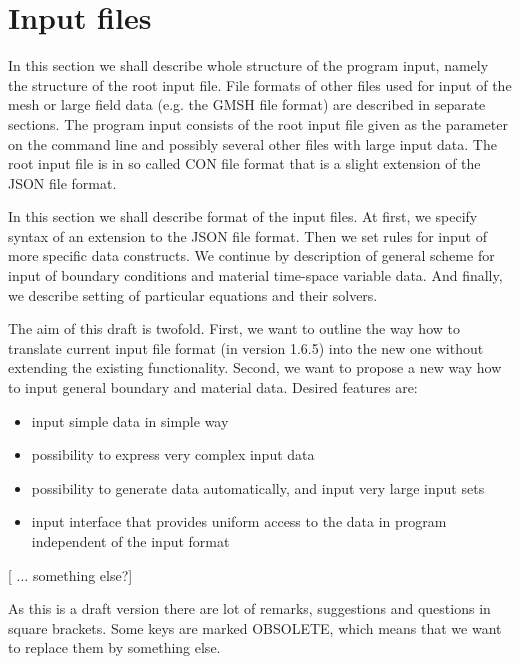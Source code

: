 

\section{Input files}

In this section we shall describe whole structure of the program input, namely the structure of the root input file. File formats of other files used for input
of the mesh or large field data (e.g. the GMSH file format) are described in separate sections. 
The program input consists of the root input file given as the parameter on the command line and possibly several other 
files with large input data. The root input file is in so called CON file format that is a slight extension of the JSON file format.

In this section we shall describe format of the input files. At first, we specify syntax of
an extension to the JSON file format. Then we set rules for input of more specific data constructs. We continue by description of general scheme for input of
boundary conditions and material time-space variable data. And finally, we describe setting of particular equations and their solvers.

The aim of this draft is twofold. First, we want to outline the way how to translate current input file format (in version 1.6.5) into the new one without extending 
the existing functionality. Second, we want to propose a new way how to input general boundary and material data. Desired features are:
\begin{itemize}
 \item input simple data in simple way
 \item possibility to express very complex input data 
 \item possibility to generate data automatically, and input very large input sets
 \item input interface that provides uniform access to the data in program independent of the input format
\end{itemize}
[ ... something else?]

As this is a draft version there are lot of remarks, suggestions and questions in square brackets. Some keys are marked OBSOLETE, which means that 
we want to replace them by something else.

